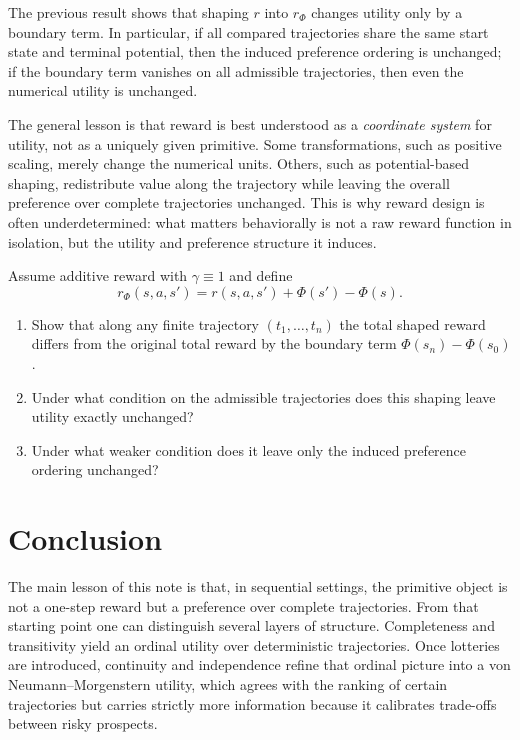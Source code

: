\documentclass[11pt]{article}
\begin{document}
The previous result shows that shaping $r$ into $r_\Phi$ changes utility only by a boundary term. 
In particular, if all
compared trajectories share the same start state and terminal potential, then
the induced preference ordering is unchanged; if the boundary term vanishes on
all admissible trajectories, then even the numerical utility is unchanged.

The general lesson is that reward is best understood as a \emph{coordinate
system} for utility, not as a uniquely given primitive. Some transformations,
such as positive scaling, merely change the numerical units. Others, such as
potential-based shaping, redistribute value along the trajectory while leaving
the overall preference over complete trajectories unchanged. This is why reward
design is often underdetermined: what matters behaviorally is not a raw reward
function in isolation, but the utility and preference structure it induces.

\begin{exercise}
\label{ex:reward-shaping}
Assume additive reward with $\gamma\equiv 1$ and define
\[
r_\Phi(s,a,s')=r(s,a,s')+\Phi(s')-\Phi(s).
\]
\begin{enumerate}[label=(\alph*)]
\item Show that along any finite trajectory $(t_1,\dots,t_n)$ the total shaped
reward differs from the original total reward by the boundary term
$\Phi(s_n)-\Phi(s_0)$.
\item Under what condition on the admissible trajectories does this shaping
leave utility exactly unchanged?
\item Under what weaker condition does it leave only the induced preference
ordering unchanged?
\end{enumerate}
\end{exercise}

\section{Conclusion}

The main lesson of this note is that, in sequential settings, the primitive
object is not a one-step reward but a preference over complete trajectories.
From that starting point one can distinguish several layers of structure.
Completeness and transitivity yield an ordinal utility over deterministic
trajectories. Once lotteries are introduced, continuity and independence refine
that ordinal picture into a von Neumann--Morgenstern utility, which agrees with
the ranking of certain trajectories but carries strictly more information
because it calibrates trade-offs between risky prospects.
\end{document}
